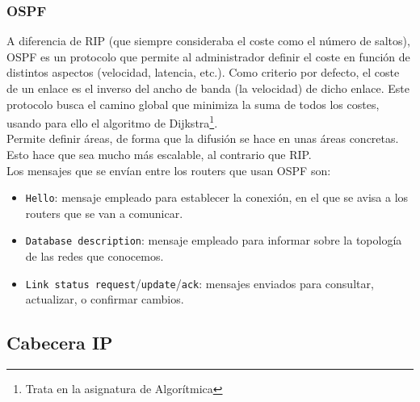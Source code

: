 \subsubsection{\acrfull{OSPF}}

A diferencia de \acrshort{RIP} (que siempre consideraba el coste como el número de saltos), \acrshort{OSPF} es un protocolo que permite al administrador definir el coste en función de distintos aspectos (velocidad, latencia, etc.).
Como criterio por defecto, el coste de un enlace es el inverso del ancho de banda (la velocidad) de dicho enlace. Este protocolo busca el camino global que minimiza la suma de todos los costes, usando para ello el algoritmo de Dijkstra\footnote{Trata en la asignatura de Algorítmica}.\\

Permite definir áreas, de forma que la difusión se hace en unas áreas concretas. Esto hace que sea mucho más escalable, al contrario que \acrshort{RIP}.\\

\noindent
Los mensajes que se envían entre los routers que usan \acrshort{OSPF} son:
\begin{itemize}
    \item \verb|Hello|: mensaje empleado para establecer la conexión, en el que se avisa a los routers que se van a comunicar.
    \item \verb|Database description|: mensaje empleado para informar sobre la topología de las redes que conocemos. 
    \item \verb|Link status request|/\verb|update|/\verb|ack|: mensajes enviados para consultar, actualizar, o confirmar cambios.
\end{itemize}


\subsection{Cabecera \acrshort{IP}}

